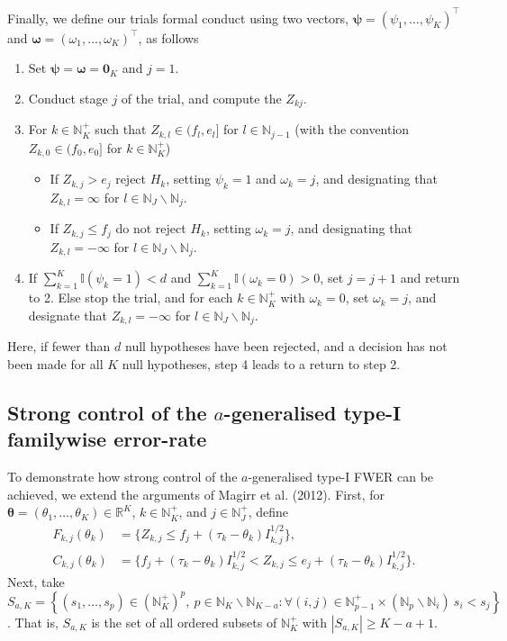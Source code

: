 \documentclass{article}
\numberwithin{equation}{section}
\theoremstyle{plain}
\begin{document}
Finally, we define our trials formal conduct using two vectors, $\boldsymbol{\psi}=(\psi_1,\dots,\psi_K)^\top$ and $\boldsymbol{\omega}=(\omega_1,\dots,\omega_K)^\top$, as follows
\begin{enumerate}
\item Set $\boldsymbol{\psi}=\boldsymbol{\omega}=\boldsymbol{0}_K$ and $j=1$.
\item Conduct stage $j$ of the trial, and compute the $Z_{kj}$.
\item For $k\in\mathbb{N}_K^+$ such that $Z_{k,l}\in (f_l,e_l]$ for $l\in\mathbb{N}_{j-1}$ (with the convention $Z_{k,0}\in (f_0,e_0]$ for $k\in\mathbb{N}_K^+$)
\begin{itemize}
\item If $Z_{k,j}>e_j $ reject $H_{k}$, setting $\psi_{k}=1$ and $\omega_{k}=j$, and designating that $Z_{k,l}=\infty$ for $l\in\mathbb{N}_J\backslash\mathbb{N}_j$.
\item If $Z_{k,j}\le f_j$ do not reject $H_{k}$, setting $\omega_{k}=j$, and designating that $Z_{k,l}=-\infty$ for $l\in\mathbb{N}_J\backslash\mathbb{N}_j$.
\end{itemize}
\item If $\sum_{k=1}^{K}\mathbb{I}(\psi_{k}=1) < d$ and $\sum_{k=1}^{K}\mathbb{I}(\omega_{k}=0) > 0$, set $j=j+1$ and return to 2. Else stop the trial, and for each $k\in\mathbb{N}_K^+$ with $\omega_{k}=0$, set $\omega_{k}=j$, and designate that $Z_{k,l}=-\infty$ for $l\in\mathbb{N}_J\backslash\mathbb{N}_j$.
\end{enumerate}
Here, if fewer than $d$ null hypotheses have been rejected, and a decision has not been made for all $K$ null hypotheses, step 4 leads to a return to step 2.

\subsection{Strong control of the $a$-generalised type-I familywise error-rate}

To demonstrate how strong control of the $a$-generalised type-I FWER can be achieved, we extend the arguments of Magirr et al. (2012). First, for $\boldsymbol{\theta}=(\theta_1,\dots,\theta_K)\in\mathbb{R}^K$, $k\in\mathbb{N}_K^+$, and $j\in\mathbb{N}_J^+$, define
\begin{align*}
F_{k,j}(\theta_k) &= \{ Z_{k,j} \le f_j + (\tau_k - \theta_k)I_{k,j}^{1/2}\},\\
C_{k,j}(\theta_k) &= \{ f_j + (\tau_k - \theta_k)I_{k,j}^{1/2} < Z_{k,j} \le e_j + (\tau_k - \theta_k)I_{k,j}^{1/2}\}.
\end{align*}
Next, take $S_{a,K} = \left\{(s_1,\dots,s_p)\in(\mathbb{N}_K^+)^p,\ p\in\mathbb{N}_{K}\backslash\mathbb{N}_{K-a} : \forall (i,j)\in\mathbb{N}_{p-1}^+\times(\mathbb{N}_{p}\backslash\mathbb{N}_{i})\ s_i<s_j \right\}$. That is, $S_{a,K}$ is the set of all ordered subsets of $\mathbb{N}_K^+$ with $|S_{a,K}|\ge K-a+1$.
\end{document}

